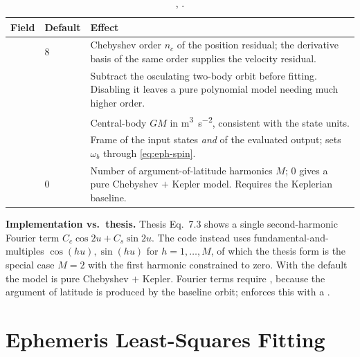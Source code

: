 \begin{table}[H]
  \centering
  \caption{, .}
  \label{tab:eph-opts}
  \begin{tabularx}{\textwidth}{@{}l l L@{}}
    \toprule
    Field & Default & Effect \\
    \midrule
     & $8$ &
      Chebyshev order $n_c$ of the position residual; the derivative basis of
      the same order supplies the velocity residual. \\
     &  &
      Subtract the osculating two-body orbit before fitting. Disabling it
      leaves a pure polynomial model needing much higher order. \\
     &  &
      Central-body $GM$ in \si{\meter\cubed\per\second\squared}, consistent
      with the state units. \\
     &  &
      Frame of the input states \emph{and} of the evaluated output; sets
      $\omega_b$ through \cref{eq:eph-spin}. \\
     & $0$ &
      Number of argument-of-latitude harmonics $M$; $0$ gives a pure
      Chebyshev $+$ Kepler model. Requires the Keplerian baseline. \\
    \bottomrule
  \end{tabularx}
\end{table}

\begin{lupntnote}
  \textbf{Implementation vs.\ thesis.} Thesis Eq.~7.3 shows a single
  second-harmonic Fourier term $C_c\cos 2u + C_s\sin 2u$. The code instead
  uses fundamental-and-multiples $\cos(hu),\sin(hu)$ for $h = 1,\dots,M$, of
  which the thesis form is the special case $M = 2$ with the first harmonic
  constrained to zero. With the default  the
  model is pure Chebyshev $+$ Kepler. Fourier terms require
  , because the argument of latitude is
  produced by the baseline orbit;  enforces this with a
  .
\end{lupntnote}

\section{Ephemeris Least-Squares Fitting}
\label{sec:eph-fit}

